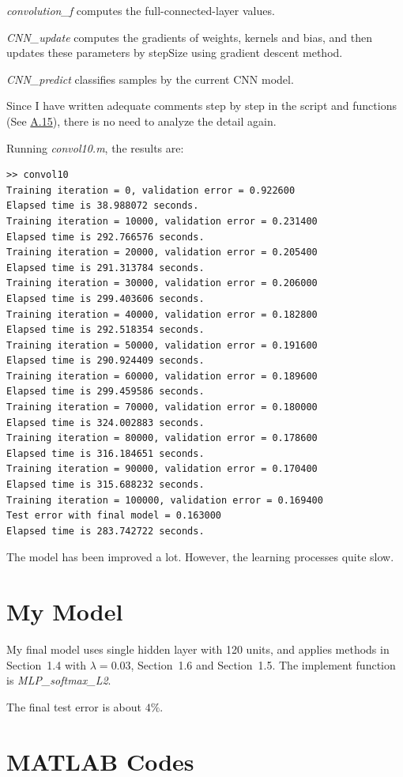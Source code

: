 \documentclass{article}
\begin{document}
\emph{convolution\_f} computes the full-connected-layer values.

\emph{CNN\_update} computes the gradients of weights, kernels and bias, and then updates these parameters by stepSize using gradient descent method.

\emph{CNN\_predict} classifies samples by the current CNN model.

Since I have written adequate comments step by step in the script and functions (See \hyperref[code-10]{A.15}), there is no need to analyze the detail again.

Running \emph{convol10.m}, the results are:
\begin{verbatim}
>> convol10
Training iteration = 0, validation error = 0.922600
Elapsed time is 38.988072 seconds.
Training iteration = 10000, validation error = 0.231400
Elapsed time is 292.766576 seconds.
Training iteration = 20000, validation error = 0.205400
Elapsed time is 291.313784 seconds.
Training iteration = 30000, validation error = 0.206000
Elapsed time is 299.403606 seconds.
Training iteration = 40000, validation error = 0.182800
Elapsed time is 292.518354 seconds.
Training iteration = 50000, validation error = 0.191600
Elapsed time is 290.924409 seconds.
Training iteration = 60000, validation error = 0.189600
Elapsed time is 299.459586 seconds.
Training iteration = 70000, validation error = 0.180000
Elapsed time is 324.002883 seconds.
Training iteration = 80000, validation error = 0.178600
Elapsed time is 316.184651 seconds.
Training iteration = 90000, validation error = 0.170400
Elapsed time is 315.688232 seconds.
Training iteration = 100000, validation error = 0.169400
Test error with final model = 0.163000
Elapsed time is 283.742722 seconds.
\end{verbatim}

The model has been improved a lot. However, the learning processes quite slow.

\section{My Model}
My final model uses single hidden layer with 120 units, and applies methods in Section~1.4 with $\lambda = 0.03$, Section~1.6 and Section~1.5. The implement function is \emph{MLP\_softmax\_L2}.

The final test error is about $4\%$.

\appendix
\section{MATLAB Codes}
\end{document}
